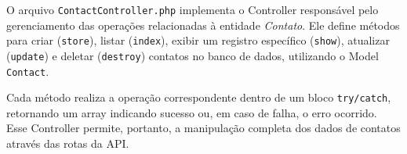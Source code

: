         

        \par O arquivo \texttt{ContactController.php} implementa o Controller responsável pelo gerenciamento das operações relacionadas à entidade \textit{Contato}. Ele define métodos para criar (\texttt{store}), listar (\texttt{index}), exibir um registro específico (\texttt{show}), atualizar (\texttt{update}) e deletar (\texttt{destroy}) contatos no banco de dados, utilizando o Model \texttt{Contact}. 
        
        \par Cada método realiza a operação correspondente dentro de um bloco \texttt{try/catch}, retornando um array indicando sucesso ou, em caso de falha, o erro ocorrido. Esse Controller permite, portanto, a manipulação completa dos dados de contatos através das rotas da API.
